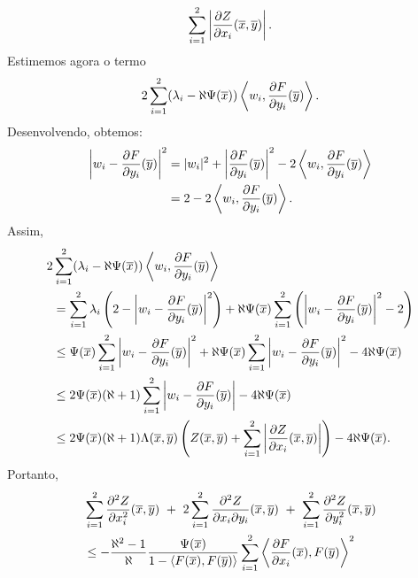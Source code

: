 \begin{demonstracao}
\begin{equation*}
\begin{aligned}
\sum_{i=1}^2\left|\frac{\partial Z}{\partial x_i}(\overline{x},\overline{y})\right|.
\end{aligned}
\end{equation*}
Estimemos agora o termo
\[
2\sum_{i=1}^2(\lambda_i-\aleph\Psi(\overline{x}))\left\langle w_i,
\frac{\partial F}{\partial y_i}(\overline{y})\right\rangle.
\]
Desenvolvendo, obtemos:
\begin{equation*}
\begin{aligned}
\left| w_i-\frac{\partial F}{\partial y_i}(\overline{y})\right|^2 &=
|w_i|^2 + \left|\frac{\partial F}{\partial y_i}(\overline{y})\right|^2 -
2\left\langle w_i,\frac{\partial F}{\partial y_i}(\overline{y})\right\rangle \\
&=
2 - 2\left\langle w_i,\frac{\partial F}{\partial y_i}(\overline{y})\right\rangle.
\end{aligned}
\end{equation*}
Assim,
\begin{equation*}
\begin{aligned}
2&\sum_{i=1}^2(\lambda_i-\aleph\Psi(\overline{x}))\left\langle w_i,
\frac{\partial F}{\partial y_i}(\overline{y})\right\rangle \\
&=
\sum_{i=1}^2\lambda_i\left(2-\left| w_i-\frac{\partial F}{\partial y_i}(\overline{y})
\right|^2\right) +
\aleph\Psi(\overline{x})\sum_{i=1}^2\left(
\left| w_i-\frac{\partial F}{\partial y_i}(\overline{y})\right|^2-2\right) \\
&\leq 
\Psi(\overline{x})\sum_{i=1}^2\left| w_i-\frac{\partial F}{\partial y_i}(\overline{y})\right|^2 +
\aleph\Psi(\overline{x})\sum_{i=1}^2
\left| w_i-\frac{\partial F}{\partial y_i}(\overline{y})\right|^2 
-4\aleph\Psi(\overline{x}) \\
&\leq
2\Psi(\overline{x})(\aleph+1)\sum_{i=1}^2
\left| w_i-\frac{\partial F}{\partial y_i}(\overline{y})\right| -4\aleph\Psi(\overline{x}) \\
& \leq
2\Psi(\overline{x})(\aleph+1)\Lambda(\overline{x},\overline{y})\left(Z(\overline{x},\overline{y})
+\sum_{i=1}^2\left|\frac{\partial Z}{\partial x_i}(\overline{x},\overline{y})\right|\right)
-4\aleph\Psi(\overline{x}).
\end{aligned}
\end{equation*}
Portanto,
\begin{equation*}
\begin{aligned}
&\sum_{i=1}^2\frac{\partial^2 Z}{\partial x_i^2}(\xb,\yb) \ + \ 
2 \sum_{i=1}^2 \frac{\partial^2 Z}{\partial x_i \partial y_i}(\xb,\yb) \ + \ 
\sum_{i=1}^2 \frac{\partial^2 Z}{\partial y_i^2}(\xb,\yb)  \\
& \leq
- \frac{\aleph^2 - 1}{\aleph} \frac{\Psi(\xb)}{1 - \langle F(\xb), F(\yb) \rangle} \sum_{i=1}^2 \left\langle \frac{\partial F}{\partial x_i}(\xb), F(\yb) \right\rangle^2 \\

\end{aligned}
\end{equation*}
\end{demonstracao}
